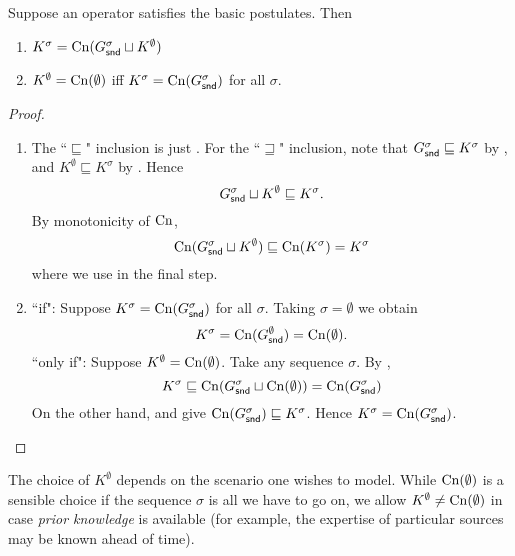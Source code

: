 \begin{proposition}
    \label{prop:prior_knowledge}
    Suppose an operator satisfies the basic postulates. Then
    \begin{enumerate}
        \item $K^\sigma = \operatorname{Cn}(G^\sigma_{\mathsf{snd}} \sqcup K^\emptyset)$
        \item $K^\emptyset = \operatorname{Cn}(\emptyset)$ iff $K^\sigma =
              \operatorname{Cn}(G^\sigma_{\mathsf{snd}})$ for all $\sigma$.
    \end{enumerate}
\end{proposition}

\begin{proof}
    \leavevmode
    \begin{enumerate}
        \item The ``$\sqsubseteq$" inclusion is just \kbound{}.
              For the ``$\sqsupseteq$" inclusion, note that $G^\sigma_{\mathsf{snd}}
              \sqsubseteq K^\sigma$ by \soundness{}, and $K^\emptyset
              \sqsubseteq K^\sigma$ by \priorext{}. Hence
              \[
                  G^\sigma_{\mathsf{snd}} \sqcup K^\emptyset
                  \sqsubseteq
                  K^\sigma.
              \]
              By monotonicity of $\operatorname{Cn}$,
              \[
                  \operatorname{Cn}(G^\sigma_{\mathsf{snd}} \sqcup K^\emptyset)
                  \sqsubseteq
                  \operatorname{Cn}(K^\sigma)
                  = K^\sigma
              \]
              where we use \closure{} in the final step.

          \item ``if": Suppose $K^\sigma = \operatorname{Cn}(G^\sigma_{\mathsf{snd}})$ for all
                $\sigma$. Taking $\sigma = \emptyset$ we obtain
                \[
                    K^\sigma = \operatorname{Cn}(G^\emptyset_{\mathsf{snd}}) = \operatorname{Cn}(\emptyset).
                \]
                ``only if": Suppose $K^\emptyset = \operatorname{Cn}(\emptyset)$. Take any
                sequence $\sigma$. By \kbound{},
                \[
                    K^\sigma
                    \sqsubseteq \operatorname{Cn}(G^\sigma_{\mathsf{snd}} \sqcup \operatorname{Cn}(\emptyset))
                    = \operatorname{Cn}(G^\sigma_{\mathsf{snd}})
                \]
                On the other hand, \soundness{} and \closure{} give
                $\operatorname{Cn}(G^\sigma_{\mathsf{snd}}) \sqsubseteq K^\sigma$. Hence $K^\sigma =
                \operatorname{Cn}(G^\sigma_{\mathsf{snd}})$.
    \end{enumerate}
\end{proof}

The choice of $K^\emptyset$ depends on the scenario one wishes to model.
While $\operatorname{Cn}(\emptyset)$ is a sensible choice if the sequence $\sigma$ is all we
have to go on, we allow $K^\emptyset \ne \operatorname{Cn}(\emptyset)$ in case \emph{prior
knowledge} is available (for example, the expertise of particular sources may
be known ahead of time).

